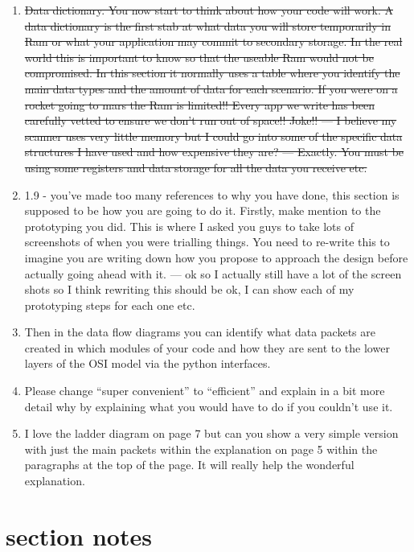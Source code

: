 \documentclass{article}
\begin{document}
\begin{enumerate}
  \item{\sout{Data dictionary. You now start to think about how your code will work. A data dictionary is the first stab at what data you will store temporarily in Ram or what your application may commit to secondary storage. In the real world this is important to know so that the useable Ram would not be  compromised.  In this section it normally uses a table where you identify the main data types and the amount of data for each scenario. If you were on a rocket going to mars the Ram is limited!! Every app we write has been carefully vetted to ensure we don’t run out of space!! Joke!! --- I believe my scanner uses very little memory but I could go into some of the specific data structures I have used and how expensive they are? --- Exactly. You must be using some registers and data storage for all the data you receive etc.}}
  \item{1.9 - you’ve made too many references to why you have done, this section is supposed to be how you are going to do it. Firstly, make mention to the prototyping you did. This is where I asked you guys to take lots of screenshots of when you were trialling things. You need to re-write this to imagine you are writing down how you propose to approach the design before actually going ahead with it. --- ok so I actually still have a lot of the screen shots so I think rewriting this should be ok, I can show each of my prototyping steps for each one etc.}
  \item{Then in the data flow diagrams you can identify what data packets are created in which modules of your code and how they are sent to the lower layers of the OSI model via the python interfaces.}


  \item{Please change “super convenient” to “efficient” and explain in a bit more detail why by explaining what you would have to do if you couldn’t use it.}

  \item{I love the ladder diagram on page 7 but can you show a very simple version with just the main packets within the explanation on page 5 within the paragraphs at the top of the page. It will really help the wonderful explanation.}

\end{enumerate}

\section{section notes}
\end{document}
